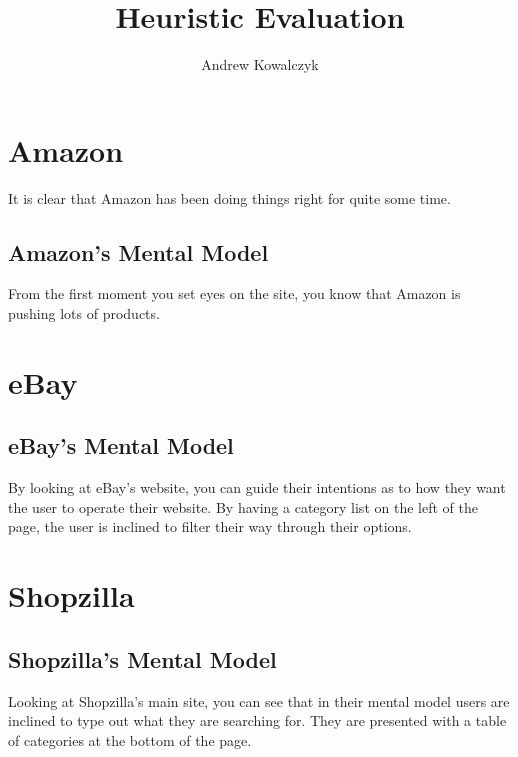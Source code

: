 \documentclass[11pt, oneside]{article}   	%
\title{Heuristic Evaluation}
\author{Andrew Kowalczyk}
\begin{document}
\maketitle

\section{Amazon}

It is clear that Amazon has been doing things right for quite some time.

\subsection{Amazon's Mental Model}

From the first moment you set eyes on the site, you know that Amazon is pushing lots of products.
%

\section{eBay}

\subsection{eBay's Mental Model}

By looking at eBay's website, you can guide their intentions as to how they want the user to operate their website. By having a category list on the left of the page, the user is inclined to filter their way through their options.

\section{Shopzilla}

\subsection{Shopzilla's Mental Model}

Looking at Shopzilla's main site, you can see that in their mental model users are inclined to type out what they are searching for. They are presented with a table of categories at the bottom of the page.
\end{document}
